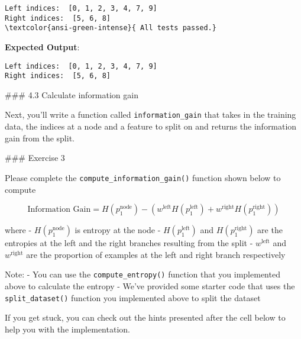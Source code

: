 \documentclass[11pt]{article}
\begin{document}
    \begin{Verbatim}[commandchars=\\\{\}]
Left indices:  [0, 1, 2, 3, 4, 7, 9]
Right indices:  [5, 6, 8]
\textcolor{ansi-green-intense}{ All tests passed.}
    \end{Verbatim}

    \textbf{Expected Output}:

\begin{verbatim}
Left indices:  [0, 1, 2, 3, 4, 7, 9]
Right indices:  [5, 6, 8]
\end{verbatim}

    \#\#\# 4.3 Calculate information gain

Next, you'll write a function called \texttt{information\_gain} that
takes in the training data, the indices at a node and a feature to split
on and returns the information gain from the split.

\#\#\# Exercise 3

Please complete the \texttt{compute\_information\_gain()} function shown
below to compute

\[\text{Information Gain} = H(p_1^\text{node})- (w^{\text{left}}H(p_1^\text{left}) + w^{\text{right}}H(p_1^\text{right}))\]

where - \(H(p_1^\text{node})\) is entropy at the node -
\(H(p_1^\text{left})\) and \(H(p_1^\text{right})\) are the entropies at
the left and the right branches resulting from the split -
\(w^{\text{left}}\) and \(w^{\text{right}}\) are the proportion of
examples at the left and right branch respectively

Note: - You can use the \texttt{compute\_entropy()} function that you
implemented above to calculate the entropy - We've provided some starter
code that uses the \texttt{split\_dataset()} function you implemented
above to split the dataset

If you get stuck, you can check out the hints presented after the cell
below to help you with the implementation.
\end{document}
